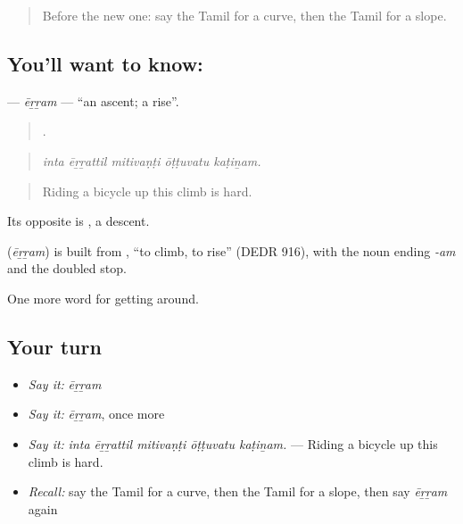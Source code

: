 \label{lesson:TA-C408-erram}



\begin{quote}
Before the new one: say the Tamil for a curve, then the Tamil for a slope.
\end{quote}

\subsection*{You'll want to know: }
\textbf{} — \emph{ēṟṟam} — \textquotedblleft{}an ascent; a rise\textquotedblright{}.

\begin{quote}
    .
\end{quote}

\begin{quote}
\emph{inta ēṟṟattil mitivaṇṭi ōṭṭuvatu kaṭiṉam.}
\end{quote}

\begin{quote}
Riding a bicycle up this climb is hard.
\end{quote}

Its opposite is , a descent.

\begin{cousinweb}
\textbf{} (\emph{ēṟṟam}) is built from , \textquotedblleft{}to climb, to rise\textquotedblright{} (DEDR 916), with the noun ending \emph{-am} and the doubled stop.
\end{cousinweb}

\begin{grammarlens}[title={What you've built}]
One more word for getting around.
\end{grammarlens}

\subsection*{Your turn}
\begin{itemize}
\raggedright
  \item \emph{Say it:} \emph{ēṟṟam}
  \item \emph{Say it:} \emph{ēṟṟam}, once more
  \item \emph{Say it:} \emph{inta ēṟṟattil mitivaṇṭi ōṭṭuvatu kaṭiṉam.} — Riding a bicycle up this climb is hard.
  \item \emph{Recall:} say the Tamil for a curve, then the Tamil for a slope, then say \emph{ēṟṟam} again
\end{itemize}


